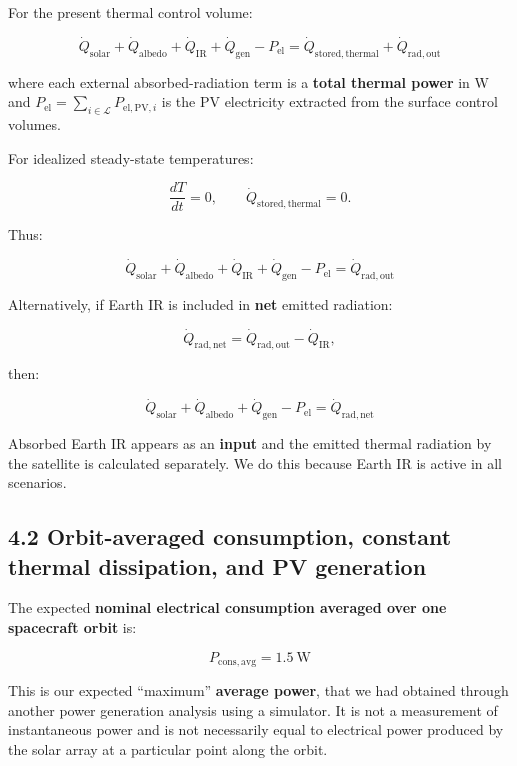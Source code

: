 \documentclass[
]{book}
\begin{document}
For the present thermal control volume:

\[
\boxed{
\dot Q_{\mathrm{solar}}
+\dot Q_{\mathrm{albedo}}
+\dot Q_{\mathrm{IR}}
+\dot Q_{\mathrm{gen}}
-P_{\mathrm{el}}
=
\dot Q_{\mathrm{stored,thermal}}
+\dot Q_{\mathrm{rad,out}}
}
\]

where each external absorbed-radiation term is a \textbf{total thermal power} in W and \(P_{\mathrm{el}}=\sum_{i\in\mathcal L}P_{\mathrm{el,PV},i}\) is the PV electricity extracted from the surface control volumes.

For idealized steady-state temperatures:

\[
\frac{dT}{dt}=0,
\qquad
\dot Q_{\mathrm{stored,thermal}}=0.
\]

Thus:

\[
\boxed{
\dot Q_{\mathrm{solar}}
+\dot Q_{\mathrm{albedo}}
+\dot Q_{\mathrm{IR}}
+\dot Q_{\mathrm{gen}}
-P_{\mathrm{el}}
=
\dot Q_{\mathrm{rad,out}}
}
\]

Alternatively, if Earth IR is included in \textbf{net} emitted radiation:

\[
\dot Q_{\mathrm{rad,net}}=\dot Q_{\mathrm{rad,out}}-\dot Q_{\mathrm{IR}},
\]

then:

\[
\boxed{
\dot Q_{\mathrm{solar}}+\dot Q_{\mathrm{albedo}}
+\dot Q_{\mathrm{gen}}-P_{\mathrm{el}}
=\dot Q_{\mathrm{rad,net}}
}
\]

Absorbed Earth IR appears as an \textbf{input} and the emitted thermal radiation by the satellite is calculated separately. We do this because Earth IR is active in all scenarios.

\subsection{4.2 Orbit-averaged consumption, constant thermal dissipation, and PV generation}\label{orbit-averaged-consumption-constant-thermal-dissipation-and-pv-generation}

The expected \textbf{nominal electrical consumption averaged over one spacecraft orbit} is:

\[
\boxed{P_{\mathrm{cons,avg}}=1.5\ \mathrm{W}}
\]

This is our expected ``maximum'' \textbf{average power}, that we had obtained through another power generation analysis using a simulator. It is not a measurement of instantaneous power and is not necessarily equal to electrical power produced by the solar array at a particular point along the orbit.
\end{document}
